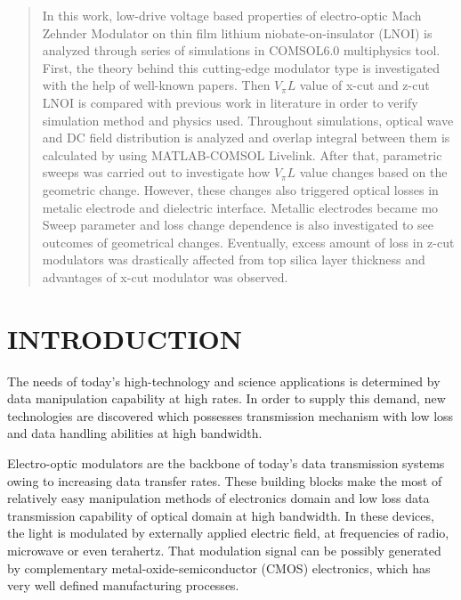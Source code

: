 \documentclass[thesis]{deutez}
\begin{document}
    \begin{abstract}
        In this work, low-drive voltage based properties of electro-optic Mach Zehnder Modulator on thin film lithium niobate-on-insulator (LNOI) is analyzed through series of simulations in COMSOL6.0 multiphysics tool. First, the theory behind this cutting-edge modulator type is investigated with the help of well-known papers. Then $V_\pi L$ value of x-cut and z-cut LNOI is compared with previous work in literature in order to verify simulation method and physics used. Throughout simulations, optical wave and DC field distribution is analyzed and overlap integral between them is calculated by using MATLAB-COMSOL Livelink. After that, parametric sweeps was carried out to investigate how $V_\pi L$ value changes based on the geometric change. However, these changes also triggered optical losses in metalic electrode and dielectric interface. Metallic electrodes became mo Sweep parameter and loss change dependence is also investigated to see outcomes of geometrical changes. Eventually, excess amount of loss in z-cut modulators was drastically affected from top silica layer thickness and advantages of x-cut modulator was observed.
    \end{abstract}

\tableofcontents
\listoftables
\listoffigures


\start

\chapter{INTRODUCTION}

    The needs of today's high-technology and science applications is determined by data manipulation capability at high rates. In order to supply this demand, new technologies are discovered which possesses transmission mechanism with low loss and data handling abilities at high bandwidth. 

    Electro-optic modulators are the backbone of today's data transmission systems owing to increasing data transfer rates. These building blocks make the most of relatively easy manipulation methods of electronics domain and low loss data transmission capability of optical domain at high bandwidth. In these devices, the light is modulated by externally applied electric field, at frequencies of radio, microwave or even terahertz. That modulation signal can be possibly generated by complementary metal-oxide-semiconductor (CMOS) electronics, which has very well defined manufacturing processes. 
   
\end{document}
